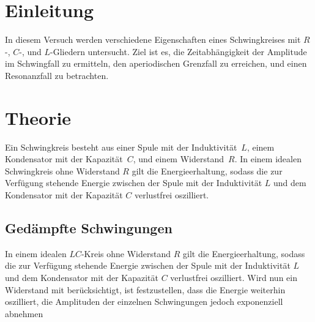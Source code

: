 \section{Einleitung}
\label{sec:Einleitung}
In diesem Versuch werden verschiedene Eigenschaften eines Schwingkreises mit $R$-, $C$-, und $L$-Gliedern untersucht. Ziel 
ist es, die Zeitabhängigkeit der Amplitude im Schwingfall zu ermitteln, den aperiodischen Grenzfall zu erreichen, und einen
Resonanzfall zu betrachten.

\section{Theorie}
\label{sec:Theorie}
Ein Schwingkreis besteht aus einer Spule mit der Induktivität~$L$, einem Kondensator mit der Kapazität~$C$, und einem 
Widerstand~$R$. In einem idealen Schwingkreis ohne Widerstand $R$ gilt die Energieerhaltung, sodass die zur Verfügung stehende Energie zwischen
der Spule mit der Induktivität $L$ und dem Kondensator mit der Kapazität $C$ verlustfrei oszilliert.
\subsection{Gedämpfte Schwingungen}
In einem idealen $LC$-Kreis ohne Widerstand $R$ gilt die Energieerhaltung, sodass die zur Verfügung stehende Energie zwischen
der Spule mit der Induktivität $L$ und dem Kondensator mit der Kapazität $C$ verlustfrei oszilliert. Wird nun ein Widerstand
mit berücksichtigt, ist festzustellen, dass die Energie weiterhin oszilliert, die Amplituden der einzelnen Schwingungen 
jedoch exponenziell abnehmen

